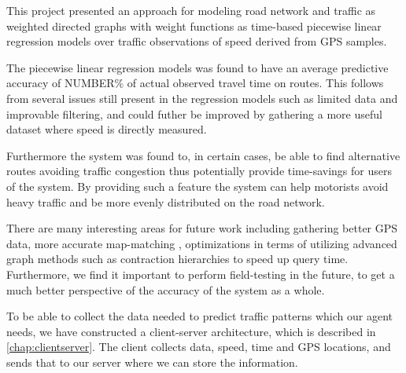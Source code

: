 This project presented an approach for modeling road network and traffic as weighted directed graphs with weight functions as time-based piecewise linear regression models over traffic observations of speed derived from GPS samples.

The piecewise linear regression models was found to have an average predictive accuracy of NUMBER\% of actual observed travel time on routes. This follows from several issues still present in the regression models such as limited data and improvable filtering, and could futher be improved by gathering a more useful dataset where speed is directly measured.

Furthermore the system was found to, in certain cases, be able to find alternative routes avoiding traffic congestion thus potentially provide time-savings for users of the system. By providing such a feature the system can help motorists avoid heavy traffic and be more evenly distributed on the road network.

There are many interesting areas for future work including gathering better GPS data, more accurate map-matching , optimizations in terms of utilizing advanced graph methods such as contraction hierarchies to speed up query time. Furthermore, we find it important to perform field-testing in the future, to get a much better perspective of the accuracy of the system as a whole.

To be able to collect the data needed to predict traffic patterns which our agent needs, we have constructed a client-server architecture, which is described in \ref{chap:clientserver}. The client collects data, speed, time and GPS locations, and sends that to our server where we can store the information.